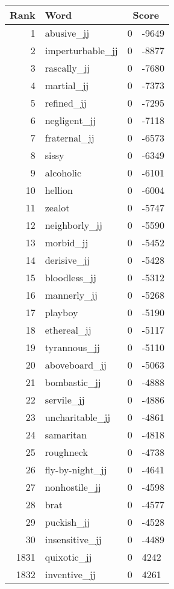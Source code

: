 \begin{longtable}[!htbp]{| rlr@{.}l |}
    \hline
    \textbf{Rank} & \textbf{Word} & \multicolumn{2}{c|}{\textbf{Score}} \\
    \hline
    \endhead
    1 & abusive\_jj & 0 & -9649 \\
    2 & imperturbable\_jj & 0 & -8877 \\
    3 & rascally\_jj & 0 & -7680 \\
    4 & martial\_jj & 0 & -7373 \\
    5 & refined\_jj & 0 & -7295 \\
    6 & negligent\_jj & 0 & -7118 \\
    7 & fraternal\_jj & 0 & -6573 \\
    8 & sissy & 0 & -6349 \\
    9 & alcoholic & 0 & -6101 \\
    10 & hellion & 0 & -6004 \\
    11 & zealot & 0 & -5747 \\
    12 & neighborly\_jj & 0 & -5590 \\
    13 & morbid\_jj & 0 & -5452 \\
    14 & derisive\_jj & 0 & -5428 \\
    15 & bloodless\_jj & 0 & -5312 \\
    16 & mannerly\_jj & 0 & -5268 \\
    17 & playboy & 0 & -5190 \\
    18 & ethereal\_jj & 0 & -5117 \\
    19 & tyrannous\_jj & 0 & -5110 \\
    20 & aboveboard\_jj & 0 & -5063 \\
    21 & bombastic\_jj & 0 & -4888 \\
    22 & servile\_jj & 0 & -4886 \\
    23 & uncharitable\_jj & 0 & -4861 \\
    24 & samaritan & 0 & -4818 \\
    25 & roughneck & 0 & -4738 \\
    26 & fly-by-night\_jj & 0 & -4641 \\
    27 & nonhostile\_jj & 0 & -4598 \\
    28 & brat & 0 & -4577 \\
    29 & puckish\_jj & 0 & -4528 \\
    30 & insensitive\_jj & 0 & -4489 \\
    1831 & quixotic\_jj & 0 & 4242 \\
    1832 & inventive\_jj & 0 & 4261 \\

\end{longtable}
